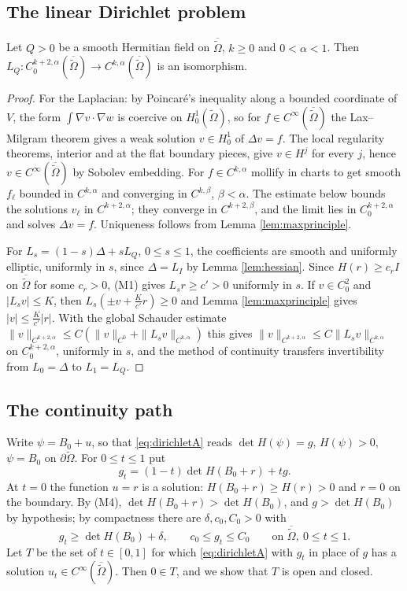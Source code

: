 \subsection{The linear Dirichlet problem}
\begin{lemma}\label{lem:lineardirichlet}
Let $Q>0$ be a smooth Hermitian field on $\overline{\tilde\Omega}$, $k\ge0$ and $0<\alpha<1$. Then
$L_Q:C^{k+2,\alpha}_0(\overline{\tilde\Omega})\to C^{k,\alpha}(\overline{\tilde\Omega})$ is an isomorphism.
\end{lemma}

\begin{proof}
For the Laplacian: by Poincar\'e's inequality along a bounded coordinate of $V$, the form
$\int\nabla v\cdot\nabla w$ is coercive on $H^1_0(\tilde\Omega)$, so for $f\in C^\infty(\overline{\tilde\Omega})$ the
Lax--Milgram theorem gives a weak solution $v\in H^1_0$ of $\Delta v=f$. The local regularity theorems,
interior and at the flat boundary pieces, give $v\in H^j$ for every $j$, hence
$v\in C^\infty(\overline{\tilde\Omega})$ by Sobolev embedding. For $f\in C^{k,\alpha}$ mollify in charts to get
smooth $f_\ell$ bounded in $C^{k,\alpha}$ and converging in $C^{k,\beta}$, $\beta<\alpha$. The estimate
below bounds the solutions $v_\ell$ in $C^{k+2,\alpha}$; they converge in $C^{k+2,\beta}$, and the limit
lies in $C^{k+2,\alpha}_0$ and solves $\Delta v=f$. Uniqueness follows from Lemma \ref{lem:maxprinciple}.

For $L_s=(1-s)\Delta+sL_Q$, $0\le s\le1$, the coefficients are smooth and uniformly elliptic,
uniformly in $s$, since $\Delta=L_I$ by Lemma \ref{lem:hessian}. Since $H(r)\ge c_rI$ on
$\overline{\tilde\Omega}$ for some $c_r>0$, (M1) gives $L_sr\ge c'>0$ uniformly in $s$. If
$v\in C^2_0$ and $|L_sv|\le K$, then $L_s(\pm v+\frac K{c'}r)\ge0$ and Lemma \ref{lem:maxprinciple} gives
$|v|\le\frac K{c'}|r|$. With the global Schauder estimate
$\|v\|_{C^{k+2,\alpha}}\le C(\|v\|_{C^0}+\|L_sv\|_{C^{k,\alpha}})$ this gives
$\|v\|_{C^{k+2,\alpha}}\le C\|L_sv\|_{C^{k,\alpha}}$ on $C^{k+2,\alpha}_0$, uniformly in $s$, and the method of
continuity \cite[Theorem 5.2]{GT01} transfers invertibility from $L_0=\Delta$ to $L_1=L_Q$.
\end{proof}

\subsection{The continuity path}
Write $\psi=B_0+u$, so that \eqref{eq:dirichletA} reads $\det H(\psi)=g$, $H(\psi)>0$,
$\psi=B_0$ on $\partial\tilde\Omega$. For $0\le t\le1$ put
\[
g_t=(1-t)\det H(B_0+r)+tg .
\]
At $t=0$ the function $u=r$ is a solution: $H(B_0+r)\ge H(r)>0$ and $r=0$ on the boundary. By (M4),
$\det H(B_0+r)>\det H(B_0)$, and $g>\det H(B_0)$ by hypothesis; by compactness there are
$\delta,c_0,C_0>0$ with
\begin{equation}\label{eq:gap}
g_t\ge\det H(B_0)+\delta,\qquad c_0\le g_t\le C_0\qquad\text{on }\overline{\tilde\Omega},\ 0\le t\le1 .
\end{equation}
Let $T$ be the set of $t\in[0,1]$ for which \eqref{eq:dirichletA} with $g_t$ in place of $g$ has a
solution $u_t\in C^\infty(\overline{\tilde\Omega})$. Then $0\in T$, and we show that $T$ is open and closed.

